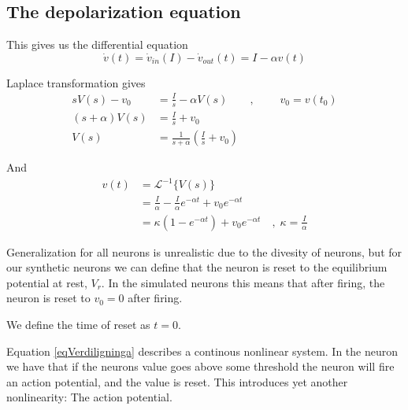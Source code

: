 \subsection{The depolarization equation}%
This gives us the differential equation 
\begin{equation}
	\dot{v}(t) = \dot{v}_{in}(I) - \dot{v}_{out}(t) = I - \alpha v(t)
\end{equation}

Laplace transformation gives
\begin{equation}
	\begin{split}
		sV(s)-v_0 		&= \frac{I}{s} - \alpha V(s) 			\qquad, \; \qquad v_0 = v(t_0) 				\\
		(s+\alpha)V(s) 	&= \frac{I}{s} + v_0 														\\
		V(s) 			&= \frac{1}{s+\alpha}\left( \frac{I}{s} + v_0 \right)
	\end{split}
\end{equation}

And 
\begin{equation}
	\begin{split}
		\label{eqVerdiligninga}
		v(t)  	&= 		\mathscr{L}^{-1}\bigg\{ V(s) \bigg\}  									\\
		 		&=		\frac{I}{\alpha} - \frac{I}{\alpha} e^{-\alpha t} + v_0 e^{-\alpha t} 	\\
				&= 		\kappa \left( 1 - e^{-\alpha t} \right) + v_0 e^{-\alpha t} 	\quad,\; \kappa = \frac{I}{\alpha} 
	\end{split}
\end{equation}

Generalization for all neurons is unrealistic due to the divesity of neurons, but for our synthetic neurons we can define that the neuron is reset to the equilibrium potential at rest, $V_r$.
In the simulated neurons this means that after firing, the neuron is reset to $v_0=0$ after firing. 

We define the time of reset as $t=0$.

Equation \eqref{eqVerdiligninga} describes a continous nonlinear system. 
In the neuron we have that if the neurons value goes above some threshold the neuron will fire an action potential, and the value is reset. This introduces yet another nonlinearity: 
The action potential.

